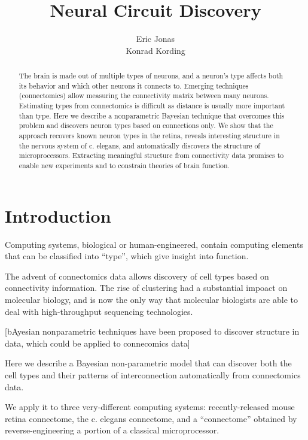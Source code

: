 \documentclass{article}
\title{Neural Circuit Discovery}
\author{Eric Jonas \\ Konrad Kording}
\begin{document}
\maketitle

\listoftodos

\begin{abstract}
  The brain is made out of multiple types of neurons, and a neuron’s
  type affects both its behavior and which other neurons it connects
  to. Emerging techniques (connectomics) allow measuring the
  connectivity matrix between many neurons. Estimating types from
  connectomics is difficult as distance is usually more important than
  type. Here we describe a nonparametric Bayesian technique that
  overcomes this problem and discovers neuron types based on
  connections only. We show that the approach recovers known neuron
  types in the retina, reveals interesting structure in the nervous
  system of c. elegans, and automatically discovers the structure of
  microprocessors. Extracting meaningful structure from connectivity
  data promises to enable new experiments and to constrain theories of
  brain function.

\end{abstract}

\section{Introduction}
Computing systems, biological or human-engineered, contain computing
elements that can be classified into ``type'', which give
insight into function. 

The advent of connectomics data allows discovery of cell types based
on connectivity information. The rise of clustering had a substantial
impoact on molecular biology, and is now the only way that molecular
biologists are able to deal with high-throughput sequencing
technologies.

[bAyesian nonparametric techniques have been proposed to 
discover structure in data, which could be applied to connecomics data]

Here we describe a Bayesian non-parametric model that can discover
both the cell types and their patterns of interconnection automatically
from connectomics data. 

We apply it to three very-different computing systems:
recently-released mouse retina connectome, the c. elegans connectome,
and a ``connectome'' obtained by reverse-engineering a portion of a
classical microprocessor.
\end{document}
